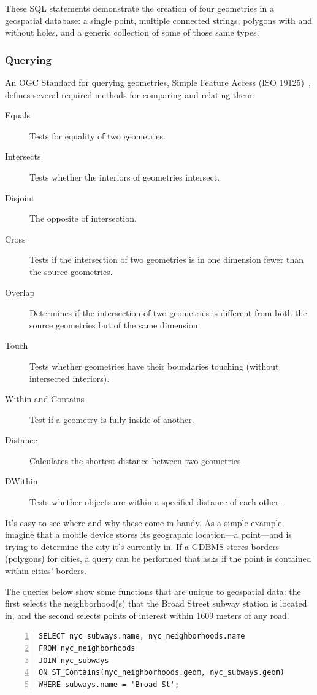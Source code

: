 These SQL statements demonstrate the creation of four geometries in a geospatial database: a single point, multiple connected strings, polygons with and without holes, and a generic collection of some of those same types.

\subsubsection{Querying}
An OGC Standard for querying geometries, Simple Feature Access (ISO 19125)~\cite{}, defines several required methods for comparing and relating them:

\begin{description}
  \item[Equals] Tests for equality of two geometries.
  \item[Intersects] Tests whether the interiors of geometries intersect.
  \item[Disjoint] The opposite of intersection.
  \item[Cross] Tests if the intersection of two geometries is in one dimension fewer than the source geometries.
  \item[Overlap] Determines if the intersection of two geometries is different from both the source geometries but of the same dimension.
  \item[Touch] Tests whether geometries have their boundaries touching (without intersected interiors).
  \item[Within and Contains] Test if a geometry is fully inside of another.
  \item[Distance] Calculates the shortest distance between two geometries.
  \item[DWithin] Tests whether objects are within a specified distance of each other.
\end{description}

It's easy to see where and why these come in handy. As a simple example, imagine that a mobile device stores its geographic location---a point---and is trying to determine the city it's currently in. If a GDBMS stores borders (polygons) for cities, a query can be performed that asks if the point is contained within cities' borders.

The queries below show some functions that are unique to geospatial data: the first selects the neighborhood(s) that the Broad Street subway station is located in, and the second selects points of interest within 1609 meters of any road.

\begin{Verbatim}[samepage=true,baselinestretch=1,numbers=left,xleftmargin=12mm]
SELECT nyc_subways.name, nyc_neighborhoods.name
FROM nyc_neighborhoods
JOIN nyc_subways
ON ST_Contains(nyc_neighborhoods.geom, nyc_subways.geom)
WHERE subways.name = 'Broad St';
\end{Verbatim}

